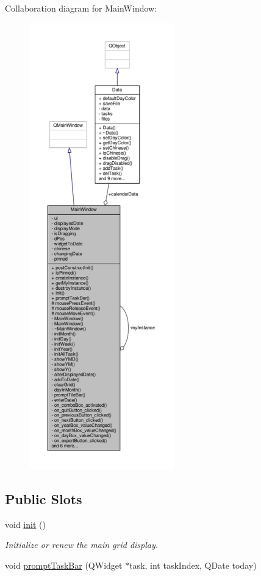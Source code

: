 Collaboration diagram for Main\+Window\+:
\nopagebreak
\begin{figure}[H]
\begin{center}
\leavevmode
\includegraphics[height=550pt]{classMainWindow__coll__graph}
\end{center}
\end{figure}
\subsection*{Public Slots}
\begin{DoxyCompactItemize}
\item 
void \hyperlink{classMainWindow_a671e7e5b0a3a7a3fb1cf44c5c8377952}{init} ()
\begin{DoxyCompactList}\small\item\em Initialize or renew the main grid display. \end{DoxyCompactList}\item 
void \hyperlink{classMainWindow_a4c5f8ee24616439a17d368fe95ab6c41}{prompt\+Task\+Bar} (Q\+Widget $\ast$task, int task\+Index, Q\+Date today)
\end{DoxyCompactItemize}
